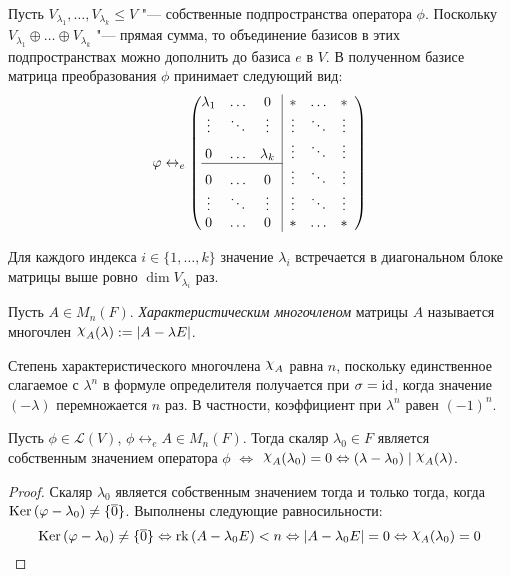 \begin{note}
	Пусть $V_{\lambda_1}, \dots, V_{\lambda_k} \le V$ "--- собственные подпространства оператора $\phi$. Поскольку $V_{\lambda_1} \oplus \dots \oplus V_{\lambda_k}$ "--- прямая сумма, то объединение базисов в этих подпространствах можно дополнить до базиса $e$ в $V$. В полученном базисе матрица преобразования $\phi$ принимает следующий вид:
	\[
	\phi \leftrightarrow_e
	\left(\begin{array}{@{}ccc|cccc@{}}
		\lambda_1 & \dots & 0 & * & \dots & *\\
		\vdots & \ddots & \vdots & \vdots & \ddots & \vdots\\
		0 & \dots & \lambda_k & \vdots &\ddots & \vdots\\
		\cline{1-3}
		0 &\dots & 0 & \vdots &\ddots & \vdots\\
		\vdots & \ddots & \vdots & \vdots & \ddots & \vdots\\
		0 & \dots & 0 & * &\dots & * 
	\end{array}\right)
	\]
	
	Для каждого индекса $i \in \{1, \dotsc, k\}$ значение $\lambda_i$ встречается в диагональном блоке матрицы выше ровно $\dim{V_{\lambda_i}}$ раз.
\end{note}

\begin{definition}
	Пусть $A \in M_n(F)$. \textit{Характеристическим многочленом} матрицы $A$ называется многочлен $\Chi_A(\lambda) := |A - \lambda E|$.
\end{definition}

\begin{note}
	Степень характеристического многочлена $\Chi_A$ равна $n$, поскольку единственное слагаемое с $\lambda^n$ в формуле определителя получается при $\sigma = \mathrm{id}$, когда значение $(-\lambda)$ перемножается $n$ раз. В частности, коэффициент при $\lambda^n$ равен $(-1)^n$.
\end{note}

\begin{proposition}
	Пусть $\phi \in \mathcal{L}(V)$, $\phi \leftrightarrow_e A \in M_n(F)$. Тогда скаляр $\lambda_0 \in F$ является собственным значением оператора  $\phi$ $\Leftrightarrow$ $\Chi_A(\lambda_0) = 0 \Leftrightarrow (\lambda - \lambda_0)\mid \Chi_A(\lambda)$.
\end{proposition}

\begin{proof}
	Скаляр $\lambda_0$ является собственным значением тогда и только тогда, когда $\operatorname{Ker}{(\varphi - \lambda_0)} \ne \{\overline{0}\}$. Выполнены следующие равносильности:
	\[\ke{(\phi - \lambda_0)} \ne \{\overline{0}\} \lra \rk{(A - \lambda_0 E)} < n \hm{\Leftrightarrow} |A - \lambda_0 E| = 0 \hm{\Leftrightarrow} \Chi_A(\lambda_0) = 0\qedhere\]
\end{proof}

